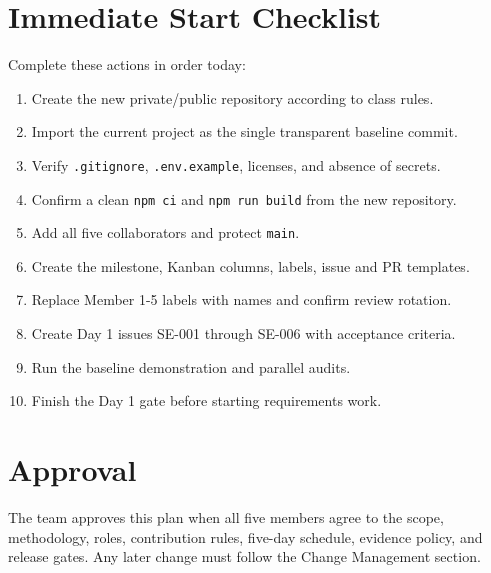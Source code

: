 \documentclass[
  10pt,
  a4paper,
  oneside]{report}
\providecommand{\tightlist}{%
  \setlength{\itemsep}{0pt}\setlength{\parskip}{0pt}}
\begin{document}
\chapter{Immediate Start Checklist}\label{29-immediate-start-checklist}

Complete these actions in order today:

\begin{enumerate}
\def\labelenumi{\arabic{enumi}.}
\tightlist
\item
  Create the new private/public repository according to class rules.
\item
  Import the current project as the single transparent baseline commit.
\item
  Verify \texttt{.gitignore}, \texttt{.env.example}, licenses, and
  absence of secrets.
\item
  Confirm a clean \texttt{npm\ ci} and \texttt{npm\ run\ build} from the
  new repository.
\item
  Add all five collaborators and protect \texttt{main}.
\item
  Create the milestone, Kanban columns, labels, issue and PR templates.
\item
  Replace Member 1-5 labels with names and confirm review rotation.
\item
  Create Day 1 issues SE-001 through SE-006 with acceptance criteria.
\item
  Run the baseline demonstration and parallel audits.
\item
  Finish the Day 1 gate before starting requirements work.
\end{enumerate}

\chapter{Approval}\label{30-approval}

The team approves this plan when all five members agree to the scope,
methodology, roles, contribution rules, five-day schedule, evidence
policy, and release gates. Any later change must follow the Change
Management section.
\end{document}
